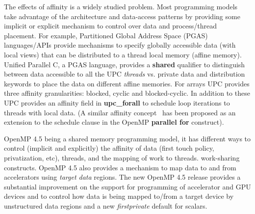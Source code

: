 The effects of affinity is a widely studied problem. Most programming models 
take advantage of the architecture and data-access patterns by providing some 
implicit or explicit mechanism to control over data and process/thread placement. For example,
Partitioned Global Address Space (PGAS) languages/APIs provide mechanisms to specify 
globally accessible data (with local views) that can be distributed to a thread local memory (affine memory). 
Unified Parallel C, a PGAS language, provides a \textbf{shared} qualifier to distinguish between data 
accessible to all the UPC \textit{threads} vs. private data and distribution keywords to place
the data on different affine memories. For arrays UPC provides 
three affinity granularities: blocked, cyclic and blocked-cyclic. In addition to these
UPC provides an affinity field in \textbf{upc\_forall} to schedule loop iterations to threads with local data.
(A similar affinity concept~\cite{nikolopoulos2001exploiting} has been proposed as an extension to the schedule clause in the OpenMP \textbf{parallel for} construct).

OpenMP 4.5 being a shared memory programming model, it has 
different ways to control (implicit and explicitly) the affinity of data (first touch policy, privatization, etc), threads, and the mapping of work to threads.
work-sharing constructs. OpenMP 4.5 also provides a mechanism to map data to and from accelerators using \textit{target data} regions. The new OpenMP 4.5 release provides a substantial 
improvement on the support for programming of accelerator and GPU devices and to control
how data is being mapped to/from a target device by unstructured data regions and a new \textit{firstprivate} default for scalars.

